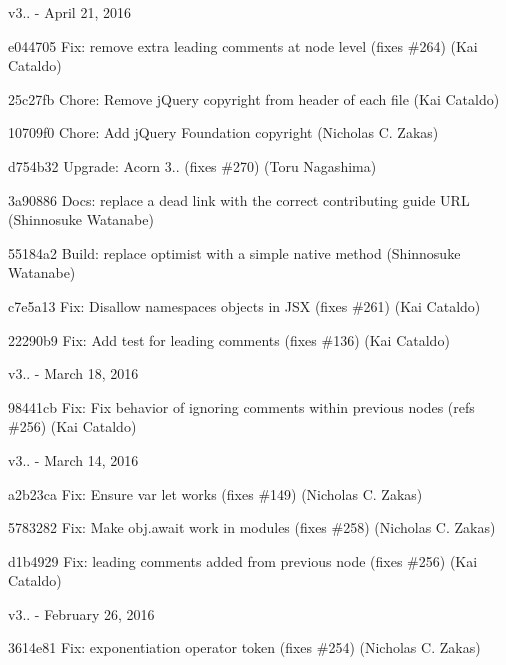 v3.. -\/ April 21, 2016


\begin{DoxyItemize}
\item e044705 Fix\+: remove extra leading comments at node level (fixes \#264) (Kai Cataldo)
\item 25c27fb Chore\+: Remove j\+Query copyright from header of each file (Kai Cataldo)
\item 10709f0 Chore\+: Add j\+Query Foundation copyright (Nicholas C. Zakas)
\item d754b32 Upgrade\+: Acorn 3.. (fixes \#270) (Toru Nagashima)
\item 3a90886 Docs\+: replace a dead link with the correct contributing guide URL (Shinnosuke Watanabe)
\item 55184a2 Build\+: replace optimist with a simple native method (Shinnosuke Watanabe)
\item c7e5a13 Fix\+: Disallow namespaces objects in JSX (fixes \#261) (Kai Cataldo)
\item 22290b9 Fix\+: Add test for leading comments (fixes \#136) (Kai Cataldo)
\end{DoxyItemize}

v3.. -\/ March 18, 2016


\begin{DoxyItemize}
\item 98441cb Fix\+: Fix behavior of ignoring comments within previous nodes (refs \#256) (Kai Cataldo)
\end{DoxyItemize}

v3.. -\/ March 14, 2016


\begin{DoxyItemize}
\item a2b23ca Fix\+: Ensure \textquotesingle{}var let\textquotesingle{} works (fixes \#149) (Nicholas C. Zakas)
\item 5783282 Fix\+: Make obj.\+await work in modules (fixes \#258) (Nicholas C. Zakas)
\item d1b4929 Fix\+: leading comments added from previous node (fixes \#256) (Kai Cataldo)
\end{DoxyItemize}

v3.. -\/ February 26, 2016


\begin{DoxyItemize}
\item 3614e81 Fix\+: exponentiation operator token (fixes \#254) (Nicholas C. Zakas)
\end{DoxyItemize}

